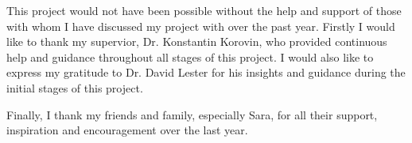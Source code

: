 This project would not have been possible without the help and support of those with whom I have discussed my project with over the past year. Firstly I would like to thank my supervior, Dr. Konstantin Korovin, who provided continuous help and guidance throughout all stages of this project. I would also like to express my gratitude to Dr. David Lester for his insights and guidance during the initial stages of this project.

Finally, I thank my friends and family, especially Sara, for all their support, inspiration and encouragement over the last year.